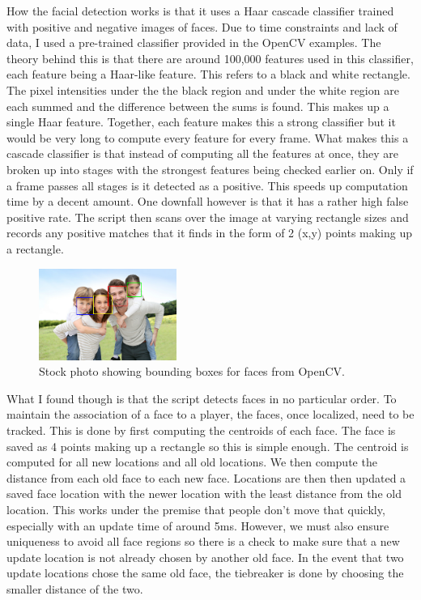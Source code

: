 \documentclass[a4paper,10pt]{article}
\begin{document}
How the facial detection works is that it uses a Haar cascade classifier trained with positive and negative images of faces. Due to time constraints and lack of data, I used a pre-trained classifier provided in the OpenCV examples. The theory behind this is that there are around 100,000 features used in this classifier, each feature being a Haar-like feature. This refers to a black and white rectangle. The pixel intensities under the the black region and under the white region are each summed and the difference between the sums is found. This makes up a single Haar feature. Together, each feature makes this a strong classifier but it would be very long to compute every feature for every frame. What makes this a cascade classifier is that instead of computing all the features at once, they are broken up into stages with the strongest features being checked earlier on. Only if a frame passes all stages is it detected as a positive. This speeds up computation time by a decent amount. One downfall however is that it has a rather high false positive rate. The script then scans over the image at varying rectangle sizes and records any positive matches that it finds in the form of 2 (x,y) points making up a rectangle.
\begin{figure}[H]
  \centering
      \includegraphics[width=0.4\textwidth]{Assets/FacialRecognition.png}
  \caption{Stock photo showing bounding boxes for faces from OpenCV.}
\end{figure}


What I found though is that the script detects faces in no particular order. To maintain the association of a face to a player, the faces, once localized, need to be tracked. This is done by first computing the centroids of each face. The face is saved as 4 points making up a rectangle so this is simple enough. The centroid is computed for all new locations and all old locations. We then compute the distance from each old face to each new face. Locations are then then updated a saved face location with the newer location with the least distance from the old location. This works under the premise that people don't move that quickly, especially with an update time of around 5ms. However, we must also ensure uniqueness to avoid all face regions so there is a check to make sure that a new update location is not already chosen by another old face. In the event that two update locations chose the same old face, the tiebreaker is done by choosing the smaller distance of the two.
\end{document}
